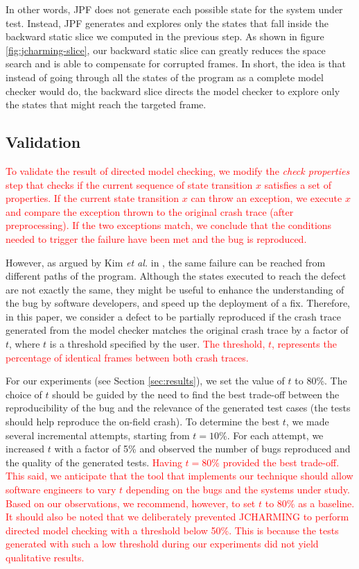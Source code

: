 \documentclass[times, doublespace]{smrauth}
\newcommand{\red}[1]{\textcolor{red}{#1}}
\begin{document}
{In other words, JPF does not generate each possible state for the system under test.
Instead, JPF generates and explores only the states that fall inside the backward static
slice we computed in the previous step.
As shown in figure \ref{fig:jcharming-slice}, our backward static slice can
greatly reduces the space search and is able to compensate for corrupted frames.
In short, the idea is that instead of going through all the states of the program as a
complete model checker would do, the backward slice directs the model checker to explore
only the states that might reach the targeted frame.

\subsection{Validation}

\red{To validate the result of directed model checking, we modify
the {\it check properties} step that checks if the current sequence
of state transition $x$ satisfies a set of properties. If the current
state transition $x$ can throw an exception, we execute $x$ and
compare the exception thrown to the original crash trace (after
preprocessing). If the two exceptions match, we conclude that
the conditions needed to trigger the failure have been met and
the bug is reproduced.}

However, as argued by Kim {\it et al.} in \cite{Kim2013b}, the same failure can
be reached from different paths of the program. Although the
states executed to reach the defect are not exactly the same,
they might be useful to enhance the understanding of the bug
by software developers, and speed up the deployment of a fix.
Therefore, in this paper, we consider a defect to be partially
reproduced if the crash trace generated from the model
checker matches the original crash trace by a factor of $t$, where
$t$ is a threshold specified by the user. \red{The threshold, $t$, represents the percentage of
identical frames between both crash traces.}

For our experiments (see Section \ref{sec:results}), we set the value of $t$ to 80\%.
The choice of $t$ should be guided by the need to find the best trade-off
between the reproducibility of the bug and
the relevance  of the generated test cases (the tests should help
 reproduce the on-field crash). To determine the best $t$, we made several incremental attempts, starting  from $t = 10\%$.  For each attempt, we increased $t$ with a factor of 5\% and
observed the number of bugs reproduced and the quality of the generated tests.
\red{Having $t = 80\%$ provided the best trade-off. This said, we anticipate that the tool that implements
our technique should allow software engineers to vary $t$ depending on the bugs and the systems under study. Based on our observations, we recommend, however,
to set $t$ to 80\% as a baseline. It should also be noted that we deliberately prevented JCHARMING to perform directed model checking with a threshold below 50\%. This is because the tests generated with such a low threshold during our experiments did not yield qualitative results.}


}
\end{document}
